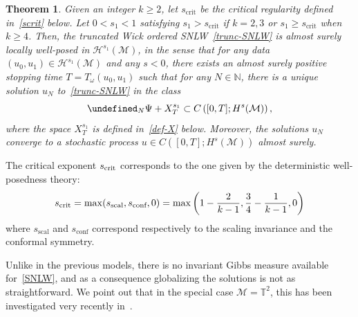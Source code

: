\documentclass[10pt]{amsart}
\newtheorem{theo}{Theorem}[section]
\theoremstyle{definition}\newtheorem{defi}[theo]{Definition}\newtheorem{rema}[theo]{Remark}\newtheorem{exam}[theo]{Example}\newtheorem{exem}[theo]{Example}\newtheorem{nota}[theo]{Notation}
\newcommand{\scrit}{s_{\textup{crit}}}
\newcommand{\sscal}{s_{\text{scal}}}
\newcommand{\sconf}{s_{\text{conf}}}
\newcommand{\T}{\mathbb{T}}
\newcommand{\N}{\mathbb{N}}
\let\P= \undefined
\newcommand{\P}{\mathbf{P}}
\newcommand{\M}{\mathcal{M}}
\renewcommand{\H}{\mathcal{H}}
\newcommand{\crit}{\mathrm{crit}}
\renewcommand{\o}{\omega}
\begin{document}
\begin{theo}\label{thm-SNLW}
Given an integer $k \geq 2$, let $s_\crit$ be the critical regularity defined in~\eqref{scrit} below. Let $0<s_1<1$ satisfying $s_1>s_\crit$ if $k=2,3$ or $s_1\geq s_\crit$ when $k\geq 4$. Then, the truncated Wick ordered SNLW~\eqref{trunc-SNLW} is almost surely locally well-posed in $\H^{s_1}(\M)$, in the sense that for any data $(u_0,u_1)\in\H^{s_1}(\M)$ and any $s<0$, there exists an almost surely positive stopping time $T=T_\o(u_0,u_1)$ such that for any $N\in\N$, there is a unique solution $u_N$ to~\eqref{trunc-SNLW} in the class
\begin{equation*}
\P_N\Psi + X^{s_1}_T\subset C\left([0, T];H^{s}(\M)\right),
\end{equation*}
where the space $X^{s_1}_T$ is defined in~\eqref{def-X} below. Moreover, the solutions $u_N$ converge to a stochastic process $u\in C([0,T];H^s(\M))$ almost surely.
\end{theo}



The critical exponent $\scrit$ corresponds to the one given by the deterministic well-posedness theory:
\begin{equation}\label{scrit}
\scrit=\max(\sscal,\sconf,0)=\max\left(1-\frac2{k-1},\frac34-\frac1{k-1},0\right)
\end{equation}
where $\sscal$ and $\sconf$ correspond respectively to the scaling invariance and the conformal symmetry.

Unlike in the previous models, there is no invariant Gibbs measure available for~\eqref{SNLW}, and as a consequence globalizing the solutions is not as straightforward. We point out that in the special case $\M=\T^2$, this has been investigated very recently in~\cite{GKOT}.
\end{document}
